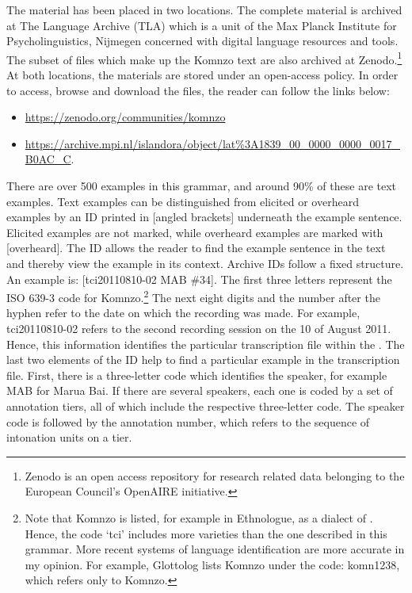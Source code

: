 The material has been placed in two locations. The complete material is archived at The Language Archive (TLA) which is a unit of the Max Planck Institute for Psycholinguistics, Nijmegen concerned with digital language resources and tools. The subset of files which make up the Komnzo text  are also archived at Zenodo.\footnote{Zenodo is an open access repository for research related data belonging to the European Council's OpenAIRE initiative.} At both locations, the materials are stored under an open-access policy. In order to access, browse and download the files, the reader can follow the links below:

\begin{itemize}
	\item \url{https://zenodo.org/communities/komnzo}
	\item \url{https://archive.mpi.nl/islandora/object/lat\%3A1839_00_0000_0000_0017_B0AC_C}.
\end{itemize}%

There are over 500 examples in this grammar, and around 90\% of these are text examples. Text examples can be distinguished from elicited or overheard examples by an  ID printed in [angled brackets] underneath the example sentence. Elicited examples are not marked, while overheard examples are marked with [overheard]. The  ID allows the reader to find the example sentence in the text  and thereby view the example in its context. Archive IDs follow a fixed structure. An example is: [tci20110810-02 MAB \#34]. The first three letters represent the ISO 639-3 code for Komnzo.\footnote{Note that Komnzo is listed, for example in Ethnologue, as a dialect of . Hence, the code `tci' includes more varieties than the one described in this grammar. More recent systems of language identification are more accurate in my opinion. For example, Glottolog lists Komnzo under the code: komn1238, which refers only to Komnzo.} The next eight digits and the number after the hyphen refer to the date on which the recording was made. For example, tci20110810-02 refers to the second recording session on the 10 of August 2011.  Hence, this information identifies the particular transcription file within the . The last two elements of the  ID help to find a particular example in the transcription file. First, there is a three-letter code which identifies the speaker, for example MAB for Marua Bai. If there are several speakers, each one is coded by a set of annotation tiers, all of which include the respective three-letter code. The speaker code is followed by the annotation number, which refers to the sequence of intonation units on a tier.

